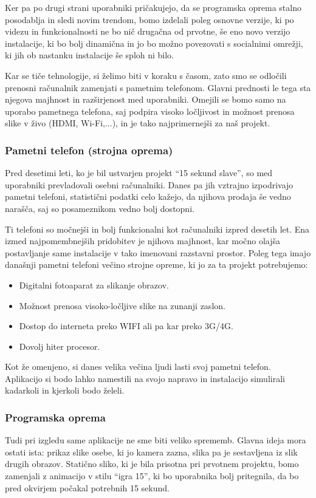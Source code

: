 Ker pa po drugi strani uporabniki pri\v cakujejo, da se programska oprema stalno posodablja in sledi novim trendom, bomo izdelali poleg osnovne verzije,
ki  po videzu in funkcionalnosti ne bo ni\v c druga\v cna od prvotne, \v se eno  novo verzijo
instalacije, ki bo bolj dinami\v cna in jo bo mo\v zno povezovati s socialnimi omre\v zji, ki jih ob nastanku instalacije \v se sploh ni bilo.

Kar  se tiče tehnologije, si želimo biti v koraku s časom, zato smo se odločili prenosni računalnik zamenjati s pametnim telefonom. Glavni prednosti le tega sta njegova majhnost in razširjenost med uporabniki. Omejili se bomo samo na uporabo pametnega telefona, saj podpira visoko ločljivost in možnost prenosa slike v živo (HDMI, Wi-Fi,...), in je tako najprimernejši za naš projekt.


\subsubsection{Pametni telefon (strojna oprema)}
Pred desetimi leti, ko je bil ustvarjen projekt  ``15 sekund slave'', so med uporabniki prevladovali osebni računalniki. Danes pa jih vztrajno izpodrivajo pametni telefoni, statistični podatki celo kažejo, da njihova prodaja še vedno narašča, saj so posameznikom vedno bolj dostopni.

Ti telefoni so močnejši in bolj funkcionalni kot računalniki izpred desetih let. Ena izmed najpomembnejših pridobitev je njihova majhnost, kar močno olajša postavljanje same instalacije v tako imenovani razstavni prostor. Poleg tega imajo današnji pametni telefoni večino strojne opreme, ki jo za ta projekt potrebujemo:
\begin{itemize}
\item Digitalni fotoaparat za slikanje obrazov.
\item Možnost prenosa visoko-ločljive slike na zunanji zaslon.
\item Dostop do interneta preko WIFI ali pa kar preko 3G/4G.
\item Dovolj hiter procesor.
\end{itemize}

Kot že omenjeno, si danes velika večina ljudi lasti svoj pametni telefon. Aplikacijo si bodo lahko namestili na svojo napravo in instalacijo simulirali kadarkoli in kjerkoli bodo želeli.


\subsubsection{Programska oprema}
Tudi pri izgledu same aplikacije ne sme biti veliko sprememb. Glavna ideja mora ostati ista: prikaz slike osebe, ki jo kamera zazna, slika pa je sestavljena iz slik drugih obrazov. Statično sliko, ki je bila prisotna pri prvotnem projektu, bomo zamenjali z animacijo v stilu ``igra 15'', ki bo uporabnika bolj pritegnila, da bo pred okvirjem počakal potrebnih 15 sekund.

